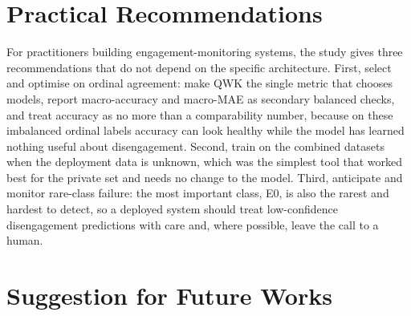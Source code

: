 \documentclass[../main.tex]{subfiles}
\begin{document}
\FloatBarrier
\section{Practical Recommendations}
\label{sec:recommendations}

For practitioners building engagement-monitoring systems, the study gives three recommendations that do not depend on the specific architecture. First, select and optimise on ordinal agreement: make QWK the single metric that chooses models, report macro-accuracy and macro-MAE as secondary balanced checks, and treat accuracy as no more than a comparability number, because on these imbalanced ordinal labels accuracy can look healthy while the model has learned nothing useful about disengagement. Second, train on the combined datasets when the deployment data is unknown, which was the simplest tool that worked best for the private set and needs no change to the model. Third, anticipate and monitor rare-class failure: the most important class, E0, is also the rarest and hardest to detect, so a deployed system should treat low-confidence disengagement predictions with care and, where possible, leave the call to a human.

\FloatBarrier
\section{Suggestion for Future Works}
\label{sec:future}
\end{document}
